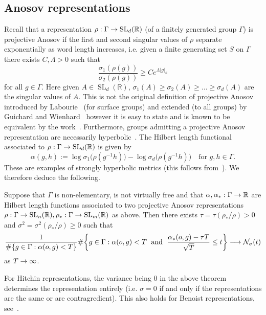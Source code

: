 \documentclass[AHL,Unicode,longabstracts,published]{cedram}
\newcommand{\G}{\Gamma}
\newcommand{\Nc}{\mathcal{N}}
\newcommand{\R}{\mathbb{R}}
\DeclareMathOperator{\SL}{SL}
\let\originalleft\left
\let\originalright\right
\renewcommand{\left}{\mathopen{}\mathclose\bgroup\originalleft}
\renewcommand{\right}{\aftergroup\egroup\originalright}
\renewcommand*{\to}{\mathchoice{\longrightarrow}{\rightarrow}{\rightarrow}{\rightarrow}}
\theoremstyle{plain}
\newcommand{\G}{\Gamma}
\begin{document}
\subsection{Anosov representations}

Recall that a representation $\rho: \G \to \SL_d(\R)$ (of a finitely generated group $\G$) is projective Anosov if the first and second singular values of $\rho$ separate exponentially as word length increases, i.e. given a finite generating set $S$ on $\G$ there exists $C, \Lambda >0$ such that
\[
\frac{\sigma_1(\rho(g))}{\sigma_2(\rho(g))} \ge C e^{\Lambda |g|_S}
\]
for all $g\in\G$. Here given $A \in \SL_d(\R)$, $\sigma_1(A) \ge \sigma_2(A) \ge \dots \ge \sigma_d(A)$ are the singular values of $A$. This is not the original definition of projective Anosov introduced by Labourie~\cite{Labourie} (for surface groups) and extended (to all groups) by Guichard and Wienhard~\cite{GuichardWeinhard} however it is easy to state and is known to be equivalent by the work~\cite{BochiPotrieSambarino}. Furthermore, groups admitting a projective Anosov representation are necessarily hyperbolic~\cite{BochiPotrieSambarino}. The Hilbert length functional associated to $\rho: \G \to \SL_d(\R)$ is given by
\[
\alpha(g,h) := \log\sigma_1\bigl(\rho(g^{-1}h)\bigr) - \log\sigma_d\bigl(\rho(g^{-1}h)\bigr) \quad \text{for $g,h \in \G$.}
\]
These are examples of strongly hyperbolic metrics (this follows from~\cite[Lemma 7.1]{cantrell.tanaka.2}). We therefore deduce the following.

\pagebreak{}
\begin{theo}
Suppose that $\G$ is non-elementary, is not virtually free and that $\alpha, \alpha_\ast: \G \to \R$ are Hilbert length functions associated to two projective Anosov representations $\rho : \G \to \SL_n(\R), \rho_\ast : \G \to \SL_m(\R)$ as above. Then there exists $\tau = \tau(\rho_\ast/\rho) >0$ and $\sigma^2 = \sigma^2(\rho_\ast/\rho) \ge 0$ such that
\begin{align*}
\frac{1}{\#\left\{ g\in\G: \alpha(o,g) < T\right\}}
\#\left\{ g\in\G: \alpha(o,g) < T \;\text{ and } \; \frac{\alpha_\ast(o,g) - \tau T}{\sqrt{T}} \le t \right\} \to \Nc_\sigma(t)
\end{align*}
as $T\to\infty$.
\end{theo}

For Hitchin representations, the variance being $0$ in the above theorem determines the representation entirely (i.e. $\sigma = 0$ if and only if the representations are the same or are contragredient). This also holds for Benoist representations, see~\cite[Remark~7.11]{weinhardetal}.
\end{document}

